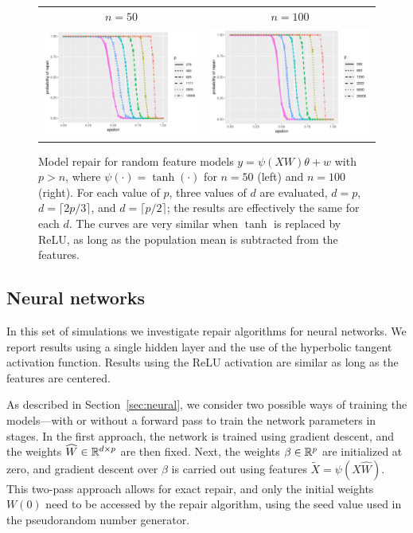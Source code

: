 \begin{figure}[ht]
  \begin{center}
    \begin{tabular}{cc}
      {\scriptsize $n=50$} & {\scriptsize $n=100$} \\
      \includegraphics[width=.47\textwidth]{figures/fig6a} &
      \includegraphics[width=.47\textwidth]{figures/fig6b}\\[-10pt]
    \end{tabular}
  \end{center}
\caption{Model repair for random feature models $y=\psi(XW)\theta + w$ with $p>n$, where $\psi(\cdot) = \tanh(\cdot)$
for $n=50$ (left) and $n=100$ (right). For each value of $p$, three values of $d$ are evaluated, $d=p$, $d=\lceil 2p/3\rceil$,
and $d=\lceil p/2\rceil$; the results are effectively the same for each $d$. The curves are very similar when $\tanh$ is replaced by ReLU, as long as the population mean is subtracted from the features.}
\label{fig:rf}
\end{figure}

\subsection{Neural networks}
\vskip10pt

In this set of simulations we investigate repair algorithms for neural networks. We report results using a single hidden layer and the use of the hyperbolic tangent activation function. Results using the ReLU activation are similar as long as the features are centered.

As described in Section~\ref{sec:neural}, we consider two possible ways of training the models---with or without a forward pass to train the network parameters in stages. In the first approach, the network is trained using gradient descent, and the weights $\widehat W\in\mathbb{R}^{d\times p}$ are then fixed. Next, the weights $\beta\in\mathbb{R}^p$ are initialized at zero, and gradient descent over $\beta$ is carried out using features
$\tilde X = \psi(X\hat W)$. This two-pass approach allows for exact repair, and only the initial weights $W(0)$ need to be accessed by the repair algorithm, using the seed value used in the pseudorandom number generator.

